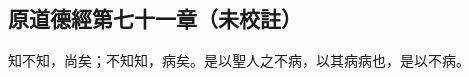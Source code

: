 ﻿%
%

\chapter{~}

\section{原道德經第七十一章（未校註）}

\begin{withgezhu}

\zhsong


知不知，尚矣；不知知，病矣。是以聖人之不病，以其病病也，是以不病。

\end{withgezhu}
